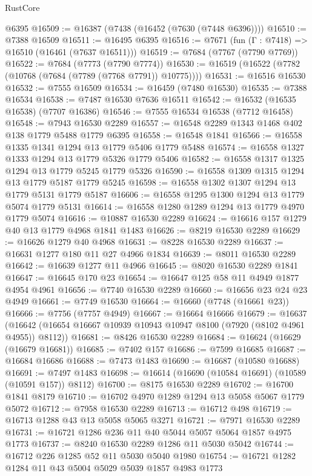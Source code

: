 \begin{lexlean}{RustCore}
\begin{coremodule}
    @6395
@16509 := @16387 (@7438 (@16452 (@7630 (@7448 @6396))))
@16510 := @7388 @16509
@16511 := @16495 @6395
@16516 := @7671 (fun (Γ : @7418) => @16510 (@16461 (@7637 @16511)))
@16519 := @7684 (@7767 (@7790 @7769))
@16522 := @7684 (@7773 (@7790 @7774))
@16530 := @16519 (@16522 (@7782 (@10768 (@7684 (@7789 (@7768 @7791)) @10775))))
@16531 := @16516 @16530
@16532 := @7555 @16509
@16534 := @16459 (@7480 @16530)
@16535 := @7388 @16534
@16538 := @7487 @16530 @7636 @16511
@16542 := @16532 (@16535 @16538) (@7707 @16386)
@16546 := @7555 @16534 @16538 (@7712 @16458)
@16548 := @7943 @16530 @2289
@16557 := @16548 @2289 @1343 @1468 @402 @138 @1779 @5488 @1779 @6395
@16558 := @16548 @1841
@16566 := @16558 @1335 @1341 @1294 @13 @1779 @5406 @1779 @5488
@16574 := @16558 @1327 @1333 @1294 @13 @1779 @5326 @1779 @5406
@16582 := @16558 @1317 @1325 @1294 @13 @1779 @5245 @1779 @5326
@16590 := @16558 @1309 @1315 @1294 @13 @1779 @5187 @1779 @5245
@16598 := @16558 @1302 @1307 @1294 @13 @1779 @5131 @1779 @5187
@16606 := @16558 @1295 @1300 @1294 @13 @1779 @5074 @1779 @5131
@16614 := @16558 @1280 @1289 @1294 @13 @1779 @4970 @1779 @5074
@16616 := @10887 @16530 @2289
@16624 := @16616 @157 @1279 @40 @13 @1779 @4968 @1841 @1483
@16626 := @8219 @16530 @2289
@16629 := @16626 @1279 @40 @4968
@16631 := @8228 @16530 @2289
@16637 := @16631 @1277 @180 @11 @27 @4966 @1834
@16639 := @8011 @16530 @2289
@16642 := @16639 @1277 @11 @4966
@16645 := @8020 @16530 @2289 @1841
@16647 := @16645 @170 @23
@16654 := @16647 @125 @58 @11 @4949 @1877 @4954 @4961
@16656 := @7740 @16530 @2289
@16660 := @16656 @23 @24 @23 @4949
@16661 := @7749 @16530
@16664 := @16660 (@7748 (@16661 @23))
@16666 := @7756 (@7757 @4949)
@16667 := @16664 @16666
@16679 := @16637
    (@16642 (@16654 @16667 @10939 @10943 @10947 @8100 (@7920 (@8102 @4961 @4955)) @8112))
@16681 := @8426 @16530 @2289
@16684 := @16624 (@16629 (@16679 @16681))
@16685 := @7402 @157
@16686 := @7599 @16685
@16687 := @16684 @16686
@16688 := @7473 @1483
@16690 := @16687 (@10580 @16688)
@16691 := @7497 @1483
@16698 := @16614 (@16690 (@10584 @16691) (@10589 (@10591 @157)) @8112)
@16700 := @8175 @16530 @2289
@16702 := @16700 @1841 @8179
@16710 := @16702 @4970 @1289 @1294 @13 @5058 @5067 @1779 @5072
@16712 := @7958 @16530 @2289
@16713 := @16712 @498
@16719 := @16713 @1288 @43 @13 @5058 @5065 @3271
@16721 := @7971 @16530 @2289
@16731 := @16721 @1286 @236 @11 @40 @5044 @5057 @5064 @1857 @4975 @1773
@16737 := @8240 @16530 @2289 @1286 @11 @5030 @5042
@16744 := @16712 @226 @1285 @52 @11 @5030 @5040 @1980
@16754 := @16721 @1282 @1284 @11 @43 @5004 @5029 @5039 @1857 @4983 @1773

\end{coremodule}
\end{lexlean}
